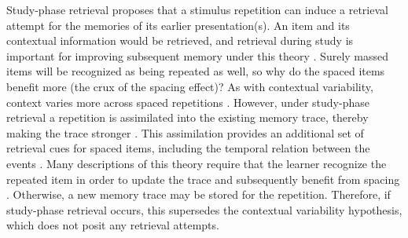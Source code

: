 


Study-phase retrieval proposes that a stimulus repetition can induce a retrieval attempt for the memories of its earlier presentation(s).  An item and its contextual information would be retrieved, and retrieval during study is important for improving subsequent memory under this theory \cite{Gree1989a,ThioDAgo1976}.  Surely massed items will be recognized as being repeated as well, so why do the spaced items benefit more (the crux of the spacing effect)?  As with contextual variability, context varies more across spaced repetitions \cite{Melt1967}.  However, under study-phase retrieval a repetition is assimilated into the existing memory trace, thereby making the trace stronger \cite{Raai2003}.
This assimilation provides an additional set of retrieval cues for spaced items, including the temporal relation between the events \cite{Gree1989a}.  Many descriptions of this theory require that the learner recognize the repeated item in order to update the trace and subsequently benefit from spacing \cite{HintBloc1973,HintEtal1975a,JohnUhl1976,Raai2003}.  Otherwise, a new memory trace may be stored for the repetition.  Therefore, if study-phase retrieval occurs, this supersedes the contextual variability hypothesis, which does not posit any retrieval attempts.


